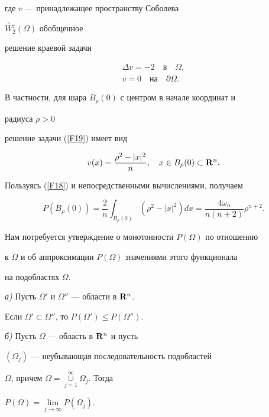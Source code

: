где $v$ --- принадлежащее пространству Соболева


$\overset{\circ}{W}{}_2^1(\Omega )$ обобщенное


решение краевой задачи


\begin{equation} \label{F19}


\begin{array}{c}


\Delta v =-2  \quad \text{в}\quad \Omega ,  \\[2mm]


v=0  \quad \text{на}\quad\partial\Omega  .


\end{array}


\end{equation}


В частности, для шара $B_\rho (0)$ с центром в начале координат и


радиуса $\rho >0$


решение задачи (\ref{F19}) имеет вид


$$


v(x)=\frac{\rho^2-|x|^2}{n}, \quad x\in B_\rho (0)\subset{\bold R}^n.


$$


Пользуясь (\ref{F18}) и непосредственными вычислениями, получаем


\begin{equation} \label{F20}


P(B_\rho (0))=\frac{2}{n}\int_{B_\rho(0)}(\rho^2-|x|^2)dx=


\frac{4\omega_n}{n(n+2)}\rho^{n+2}.


\end{equation}


Нам потребуется утверждение о монотонности $P(\Omega)$ по отношению


к $\Omega$ и об аппроксимации $P(\Omega)$ значениями этого функционала 


на подобластях $\Omega$.





\begin{lem} \label{Le1}


{\em а)} Пусть $\Omega '$  и $\Omega ''$ --- области в ${\bold R}^n$.


Если  $\Omega ' \subset\Omega ''$, то $P(\Omega ')\leq P(\Omega


'')$.





{\em б)} Пусть $\Omega$ --- область в ${\bold R}^n$ и пусть


$(\Omega_j)$ --- неубывающая последовательность подобластей


$\Omega$, причем $\Omega=\mathop{\cup}\limits_{j=1}^\infty \Omega_j$. Тогда


$P(\Omega)=\lim\limits_{j\to\infty}P(\Omega_j)$.


\end{lem}





